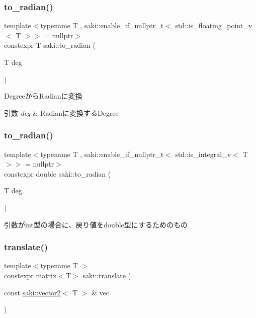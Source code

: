 \subsubsection{\texorpdfstring{to\+\_\+radian()}{to\_radian()}\hspace{0.1cm}{\footnotesize\ttfamily [1/2]}}
{\footnotesize\ttfamily template$<$typename T , saki\+::enable\+\_\+if\+\_\+nullptr\+\_\+t$<$ std\+::is\+\_\+floating\+\_\+point\+\_\+v$<$ T $>$$>$  = nullptr$>$ \\
constexpr T saki\+::to\+\_\+radian (\begin{DoxyParamCaption}\item[{T}]{deg }\end{DoxyParamCaption})}



Degreeから\+Radianに変換 


\begin{DoxyParams}{引数}
{\em deg} & Radianに変換する\+Degree \\
\hline
\end{DoxyParams}
\mbox{\label{namespacesaki_aa671d122197cf10439eee0d271f51fe6}} 
\subsubsection{\texorpdfstring{to\+\_\+radian()}{to\_radian()}\hspace{0.1cm}{\footnotesize\ttfamily [2/2]}}
{\footnotesize\ttfamily template$<$typename T , saki\+::enable\+\_\+if\+\_\+nullptr\+\_\+t$<$ std\+::is\+\_\+integral\+\_\+v$<$ T $>$$>$  = nullptr$>$ \\
constexpr double saki\+::to\+\_\+radian (\begin{DoxyParamCaption}\item[{T}]{deg }\end{DoxyParamCaption})}



引数がint型の場合に、戻り値をdouble型にするためのもの 

\mbox{\label{namespacesaki_a2311e77a2bed9d914a6b3e8056d6023a}} 
\subsubsection{\texorpdfstring{translate()}{translate()}\hspace{0.1cm}{\footnotesize\ttfamily [1/3]}}
{\footnotesize\ttfamily template$<$typename T $>$ \\
constexpr \mbox{\hyperlink{classsaki_1_1matrix}{matrix}}$<$T$>$ saki\+::translate (\begin{DoxyParamCaption}\item[{const \mbox{\hyperlink{classsaki_1_1vector2}{saki\+::vector2}}$<$ T $>$ \&}]{vec }\end{DoxyParamCaption})}



